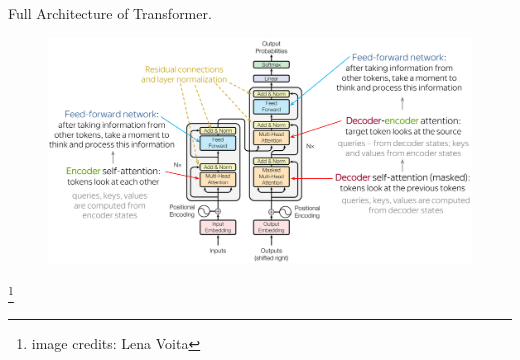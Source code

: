 \documentclass{beamer}
\begin{document}
\begin{frame}{Full Architecture of Transformer.}
    \begin{figure}
        \centering
        \includegraphics[width=1\linewidth]{f4.png}
        \label{fig:enter-label}
    \end{figure}
    \footnote{image credits: Lena Voita}
\end{frame}
\end{document}
